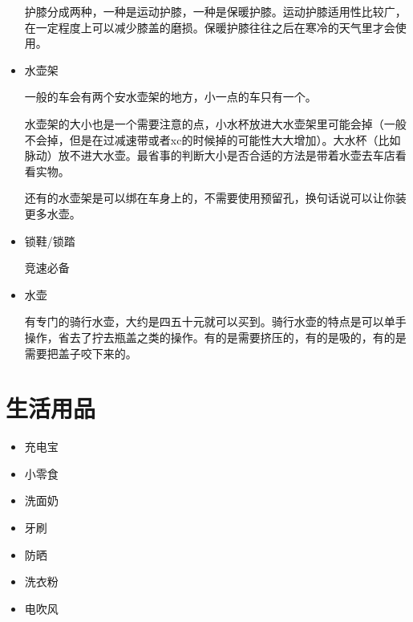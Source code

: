 \documentclass{ctexbook}
\begin{document}
\begin{itemize}
        护膝分成两种，一种是运动护膝，一种是保暖护膝。运动护膝适用性比较广，在一定程度上可以减少膝盖的磨损。保暖护膝往往之后在寒冷的天气里才会使用。

        \item 水壶架
        
        一般的车会有两个安水壶架的地方，小一点的车只有一个。

        水壶架的大小也是一个需要注意的点，小水杯放进大水壶架里可能会掉（一般不会掉，但是在过减速带或者xc的时候掉的可能性大大增加）。大水杯（比如脉动）放不进大水壶。最省事的判断大小是否合适的方法是带着水壶去车店看看实物。

        还有的水壶架是可以绑在车身上的，不需要使用预留孔，换句话说可以让你装更多水壶。
        \item 锁鞋/锁踏
        
        竞速必备
        \item 水壶
        
        有专门的骑行水壶，大约是四五十元就可以买到。骑行水壶的特点是可以单手操作，省去了拧去瓶盖之类的操作。有的是需要挤压的，有的是吸的，有的是需要把盖子咬下来的。
    \end{itemize}
\section{生活用品} 
    \begin{itemize}
        \item 充电宝
        \item 小零食
        \item 洗面奶
        \item 牙刷
        \item 防晒
        \item 洗衣粉
        \item 电吹风
    \end{itemize}
\end{document}
